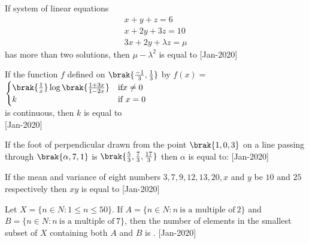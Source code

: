 \iffalse

\title{Assignment}
\author{EE24BTECH11051}
\section{integer}
\fi



\item If system of linear equations \\
\begin{align*}
   x+y+z=6  \\
   x + 2y + 3z = 10 \\
   3x + 2y + \lambda z = \mu
\end{align*}
has more than two solutions, then $\mu - \lambda^2$ is equal to
\hfill [Jan-2020]


\item If the function $f$ defined on $\brak{\frac{-1}{3},\frac{1}{3}}$ by
    $f(x) = $
$\begin{cases}
   \brak{\frac{1}{x}}\log\brak{\frac{1+3x}{1-2x}}  & \text{if} x \neq 0\\
    k & \text{if} \  x=0
\end{cases}$\\ 
is continuous, then $k$ is equal to\\
\hfill [Jan-2020]

\item If the foot of perpendicular drawn from the point $\brak{1,0,3}$ on a line passing through $\brak{\alpha,7,1}$ is $\brak{\frac{5}{3},\frac{7}{3},\frac{17}{3}}$ then $\alpha$ is equal to:
\hfill [Jan-2020]

\item  If the mean and variance of eight numbers $3, 7, 9, 12, 13, 20, x$ and $y$ be $10$ and $25$ respectively then $xy$ is equal to
\hfill [Jan-2020]

\item Let $X = \{n \in N: 1 \leq n \leq 50\}$. If $A= \{n \in N: n \ \text{is a multiple of} \ 2\}$ and $B = \{n \in N: n \ \text{is a multiple of} \ 7\}$, then the number of elements in the smallest subset of $X$ containing both $A$ and $B$ is .
\hfill [Jan-2020]









